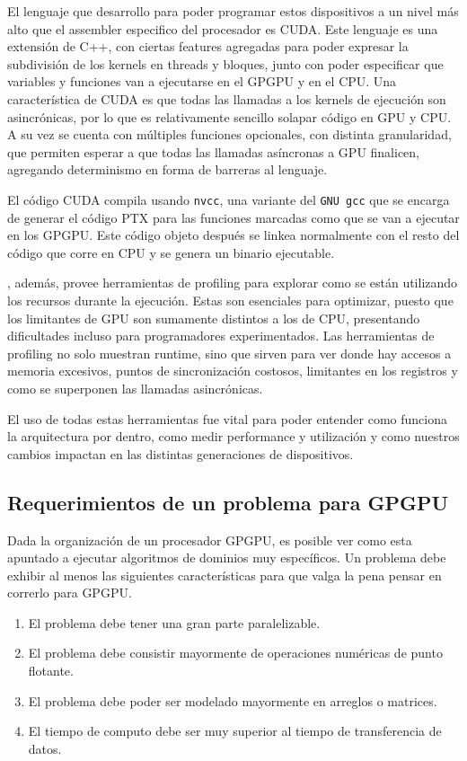 El lenguaje que desarrollo \nvidia{} para poder programar estos dispositivos a un nivel m\'as alto
que el assembler especifico del procesador es CUDA. Este lenguaje es una extensi\'on de C++, con ciertas
features agregadas para poder expresar la subdivisi\'on de los kernels en threads y bloques, junto
con poder especificar que variables y funciones van a ejecutarse en el GPGPU y en el CPU. Una caracter\'istica
de CUDA es que todas las llamadas a los kernels de ejecuci\'on son asincr\'onicas, por lo que es relativamente
sencillo solapar c\'odigo en GPU y CPU. A su vez se cuenta con m\'ultiples funciones opcionales, con distinta
granularidad, que permiten esperar a que todas las llamadas as\'incronas a GPU finalicen, agregando determinismo
en forma de barreras al lenguaje.

El c\'odigo CUDA compila usando \texttt{nvcc}, una variante del \texttt{GNU gcc} que se
encarga de generar el c\'odigo PTX para las funciones marcadas como que se van a ejecutar
en los GPGPU. Este c\'odigo objeto despu\'es se linkea normalmente con el resto del c\'odigo que corre en CPU
y se genera un binario ejecutable.

\nvidia, adem\'as, provee herramientas de profiling para explorar como se est\'an utilizando los recursos durante la ejecuci\'on.
Estas son esenciales para optimizar, puesto que los limitantes de GPU son sumamente distintos a los de CPU, presentando dificultades incluso para programadores experimentados.
Las herramientas de profiling no solo muestran runtime, sino que sirven para ver donde hay accesos a memoria excesivos, puntos de sincronizaci\'on costosos, limitantes en los registros y como se superponen las llamadas asincr\'onicas.

El uso de todas estas herramientas fue vital para poder entender como funciona la arquitectura por dentro, como medir performance y utilizaci\'on y como nuestros cambios impactan en las distintas generaciones de dispositivos.

\subsection{Requerimientos de un problema para GPGPU}

Dada la organizaci\'on de un procesador GPGPU, es posible ver como esta apuntado a ejecutar algoritmos de dominios muy espec\'ificos.
Un problema debe exhibir al menos las siguientes caracter\'isticas para que valga la pena pensar en correrlo para GPGPU.
\begin{enumerate}
  \item \label{req:paralelo} El problema debe tener una gran parte paralelizable.
  \item \label{req:float} El problema debe consistir mayormente de operaciones num\'ericas de punto flotante.
  \item \label{req:matrix} El problema debe poder ser modelado mayormente en arreglos o matrices.
  \item \label{req:transf} El tiempo de computo debe ser muy superior al tiempo de transferencia de datos.
\end{enumerate}

